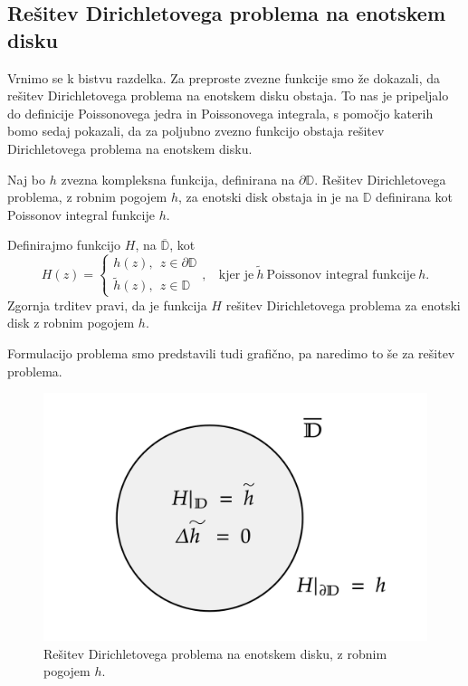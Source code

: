 \documentclass[mat1, tisk]{fmfdelo}
\begin{document}
\subsection{Rešitev Dirichletovega problema na enotskem disku}
    Vrnimo se k bistvu razdelka. Za preproste zvezne funkcije smo že dokazali, da rešitev Dirichletovega problema na enotskem disku obstaja. To nas je pripeljalo do definicije Poissonovega jedra in Poissonovega integrala, s pomočjo katerih bomo sedaj pokazali, da za poljubno zvezno funkcijo obstaja rešitev Dirichletovega problema na enotskem disku.
    \begin{trditev}
        \label{obstoj}
        Naj bo $h$ zvezna kompleksna funkcija, definirana na $\partial \mathbb{D}$. Rešitev Dirichletovega problema, z robnim pogojem $h$, za enotski disk obstaja in je na $\mathbb{D}$ definirana kot Poissonov integral funkcije $h$.
    \end{trditev}
    \begin{opomba}
        \label{opomba_obstoj}
        Definirajmo funkcijo $H$, na $\overline{\mathbb{D}}$, kot
        $$
            H(z) = \begin{cases}
                    h(z),~~z \in \partial \mathbb{D}\\
                    \widetilde{h}(z),~~z \in \mathbb{D}
            \end{cases},~~~~\text{kjer je}~\widetilde{h}~\text{Poissonov integral funkcije}~h.
        $$
        Zgornja trditev pravi, da je funkcija $H$ rešitev Dirichletovega problema za enotski disk z robnim pogojem $h$. 

        Formulacijo problema smo predstavili tudi grafično, pa naredimo to še za rešitev problema. 
        \begin{figure}[H]
            \begin{center}
                \includegraphics[width = \textwidth]{dirichlet_resitev.png}
                \caption{Rešitev Dirichletovega problema na enotskem disku, z robnim pogojem $h$.}
            \end{center}    
        \end{figure}
     \end{opomba}
\end{document}
